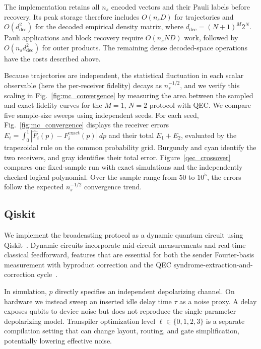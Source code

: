 \documentclass[aps,physrev,10pt,twocolumn,superscriptaddress,floatfix]{revtex4-2}
\begin{document}
The implementation retains all $n_s$ encoded vectors and their Pauli labels before recovery. Its peak storage therefore includes $O(n_sD)$ for trajectories and $O(d_{\mathrm{dec}}^2)$ for the decoded empirical density matrix, where $d_{\mathrm{dec}}=(N+1)^M2^N$. Pauli applications and block recovery require $O(n_sND)$ work, followed by $O(n_s d_{\mathrm{dec}}^2)$ for outer products. The remaining dense decoded-space operations have the costs described above.

Because trajectories are independent, the statistical fluctuation in each scalar observable (here the per-receiver fidelity) decays as $n_s^{-1/2}$, and we verify this scaling in Fig.~\ref{fig:mc_convergence} by measuring the area between the sampled and exact fidelity curves for the $M =1$, $N =2$ protocol with QEC. We compare five sample-size sweeps using independent seeds. For each seed, Fig.~\ref{fig:mc_convergence} displays the receiver errors $E_i=\int_0^1|\widehat F_i(p)-F_i^{\mathrm{exact}}(p)|\,dp$ and their total $E_1+E_2$, evaluated by the trapezoidal rule on the common probability grid. Burgundy and cyan identify the two receivers, and gray identifies their total error. Figure~\ref{qec_crossover} compares one fixed-sample run with exact simulations and the independently checked logical polynomial. Over the sample range from 50 to $10^5$, the errors follow the expected $n_s^{-1/2}$ convergence trend.

\subsection{Qiskit}
We implement the broadcasting protocol as a dynamic quantum circuit using Qiskit~\cite{javadi2024qiskit}. Dynamic circuits incorporate mid-circuit measurements and real-time classical feedforward, features that are essential for both the sender Fourier-basis measurement with byproduct correction and the QEC syndrome-extraction-and-correction cycle~\cite{corcoles2021dynamic}.

In simulation, $p$ directly specifies an independent depolarizing channel. On hardware we instead sweep an inserted idle delay time $\tau$ as a noise proxy. A delay exposes qubits to device noise but does not reproduce the single-parameter depolarizing model. Transpiler optimization level $\ell\in\{0,1,2,3\}$ is a separate compilation setting that can change layout, routing, and gate simplification, potentially lowering effective noise.
\end{document}
